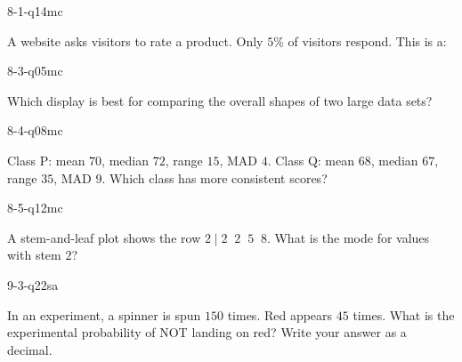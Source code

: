 \begin{practiceQuestion}{8-1-q14}{mc}
\begin{questionText}
A website asks visitors to rate a product. Only $5\%$ of visitors respond. This is a:
\end{questionText}
\end{practiceQuestion}

\begin{practiceQuestion}{8-3-q05}{mc}
\begin{questionText}
Which display is best for comparing the overall shapes of two large data sets?
\end{questionText}
\end{practiceQuestion}

\begin{practiceQuestion}{8-4-q08}{mc}
\begin{questionText}
Class P: mean $70$, median $72$, range $15$, MAD $4$.
Class Q: mean $68$, median $67$, range $35$, MAD $9$.
Which class has more consistent scores?
\end{questionText}
\end{practiceQuestion}

\begin{practiceQuestion}{8-5-q12}{mc}
\begin{questionText}
A stem-and-leaf plot shows the row $2 \mid 2\;\;2\;\;5\;\;8$. What is the mode for values with stem $2$?
\end{questionText}
\end{practiceQuestion}

\begin{practiceQuestion}{9-3-q22}{sa}
\begin{questionText}
In an experiment, a spinner is spun $150$ times. Red appears $45$ times. What is the experimental probability of NOT landing on red? Write your answer as a decimal.
\end{questionText}
\end{practiceQuestion}


